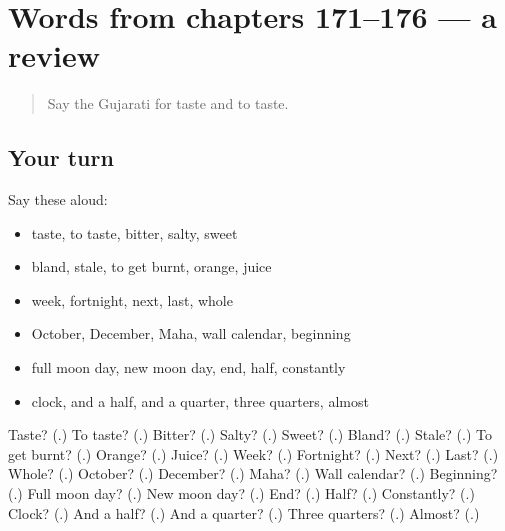 \section[(dialogue)]{Words from chapters 171–176 — a review}

\label{lesson:GU-R176-review-171-176}



\begin{quote}
Say the Gujarati for taste and to taste.
\end{quote}

\subsection*{Your turn}
Say these aloud:

\begin{itemize}
\raggedright
  \item taste, to taste, bitter, salty, sweet
  \item bland, stale, to get burnt, orange, juice
  \item week, fortnight, next, last, whole
  \item October, December, Maha, wall calendar, beginning
  \item full moon day, new moon day, end, half, constantly
  \item clock, and a half, and a quarter, three quarters, almost
\end{itemize}

\begin{tcolorbox}[breakable,colback=teal!4,colframe=teal!35!black,title={Before you move on}]
Taste? (\textbf{}.) To taste? (\textbf{}.) Bitter? (\textbf{}.) Salty? (\textbf{}.) Sweet? (\textbf{}.) Bland? (\textbf{}.) Stale? (\textbf{}.) To get burnt? (\textbf{}.) Orange? (\textbf{}.) Juice? (\textbf{}.) Week? (\textbf{}.) Fortnight? (\textbf{}.) Next? (\textbf{}.) Last? (\textbf{}.) Whole? (\textbf{}.) October? (\textbf{}.) December? (\textbf{}.) Maha? (\textbf{}.) Wall calendar? (\textbf{}.) Beginning? (\textbf{}.) Full moon day? (\textbf{}.) New moon day? (\textbf{}.) End? (\textbf{}.) Half? (\textbf{}.) Constantly? (\textbf{}.) Clock? (\textbf{}.) And a half? (\textbf{}.) And a quarter? (\textbf{}.) Three quarters? (\textbf{}.) Almost? (\textbf{}.)
\end{tcolorbox}
